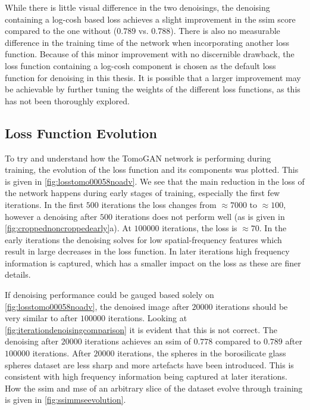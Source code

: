 While there is little visual difference in the two denoisings, the denoising containing a log-cosh based loss achieves a slight improvement in the \gls{ssim} score compared to the one without ($0.789$ vs. $0.788$). There is also no measurable difference in the training time of the network when incorporating another loss function. Because of this minor improvement with no discernible drawback, the loss function containing a log-cosh component is chosen as the default loss function for denoising in this thesis. It is possible that a larger improvement may be achievable by further tuning the weights of the different loss functions, as this has not been thoroughly explored. 

\subsection{Loss Function Evolution}
To try and understand how the TomoGAN network is performing during training, the evolution of the loss function and its components was plotted. This is given in \cref{fig:losstomo00058noadv}. We see that the main reduction in the loss of the network happens during early stages of training, especially the first few iterations. In the first $500$ iterations the loss changes from $\approx 7000$ to $\approx 100$, however a denoising after $500$ iterations does not perform well (as is given in \cref{fig:croppednoncroppedearly}a). At $100000$ iterations, the loss is $\approx 70$. In the early iterations the denoising solves for low spatial-frequency features which result in large decreases in the loss function. In later iterations high frequency information is captured, which has a smaller impact on the loss as these are finer details. 

If denoising performance could be gauged based solely on \cref{fig:losstomo00058noadv}, the denoised image after $20000$ iterations should be very similar to after $100000$ iterations. Looking at \cref{fig:iterationdenoisingcomparison} it is evident that this is not correct. The denoising after $20000$ iterations achieves an \gls{ssim} of $0.778$ compared to $0.789$ after $100000$ iterations. After $20000$ iterations, the spheres in the borosilicate glass spheres dataset are less sharp and more artefacts have been introduced. This is consistent with high frequency information being captured at later iterations. How the \gls{ssim} and \gls{mse} of an arbitrary slice of the dataset evolve through training is given in \cref{fig:ssimmseevolution}. 

